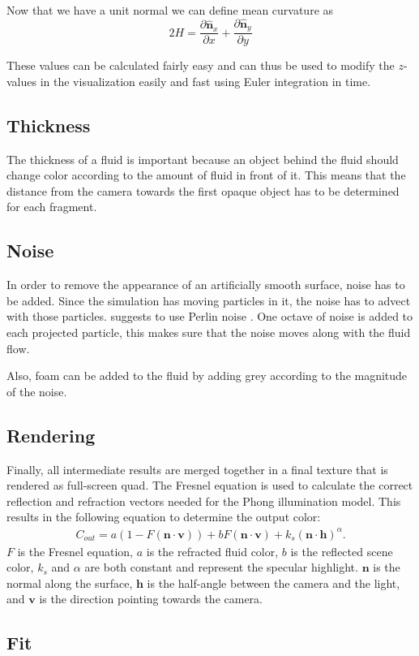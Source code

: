 Now that we have a unit normal we can define mean curvature as \[2H = \frac{\partial \hat{\mathbf{n}}_x}{\partial x} + \frac{\partial\hat{\mathbf{n}}_y}{\partial y}\]

These values can be calculated fairly easy and can thus be used to modify the \(z\)-values in the visualization easily and fast using Euler integration in time.

\subsection{Thickness}
The thickness of a fluid is important because an object behind the fluid should change color according to the amount of fluid in front of it.
This means that the distance from the camera towards the first opaque object has to be determined for each fragment.

\subsection{Noise}
In order to remove the appearance of an artificially smooth surface, noise has to be added.
Since the simulation has moving particles in it, the noise has to advect with those particles.
\cite{van2009screen} suggests to use Perlin noise \cite{perlin1985image}.
One octave of noise is added to each projected particle, this makes sure that the noise moves along with the fluid flow.

Also, foam can be added to the fluid by adding grey according to the magnitude of the noise.

\subsection{Rendering}
Finally, all intermediate results are merged together in a final texture that is rendered as full-screen quad.
The Fresnel equation is used to calculate the correct reflection and refraction vectors needed for the Phong \cite{phong1975illumination} illumination model.
This results in the following equation \cite{van2009screen}to determine the output color:
\begin{eqnarray}
C_{out} = a(1 - F(\mathbf{n} \cdot \mathbf{v})) + bF(\mathbf{n} \cdot \mathbf{v}) + k_s(\mathbf{n} \cdot \mathbf{h})^\alpha.
\end{eqnarray}
$F$ is the Fresnel equation, $a$ is the refracted fluid color, $b$ is the reflected scene color, $k_s$ and $\alpha$ are both constant and represent the specular highlight. $\mathbf{n}$ is the normal along the surface, $\mathbf{h}$ is the half-angle between the camera and the light, and $\mathbf{v}$ is the direction pointing towards the camera.


\subsection{Fit}